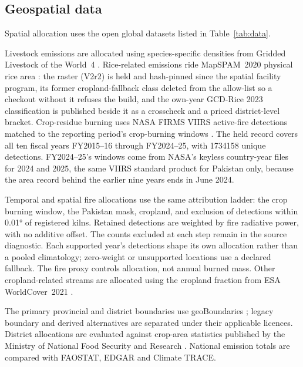\subsection{Geospatial data}

Spatial allocation uses the open global datasets listed in Table~\ref{tab:data}.

Livestock emissions are allocated using species-specific densities from Gridded Livestock of
the World~4 \citep{glw4}. Rice-related emissions ride MapSPAM~2020 physical rice
area \citep{mapspam2020}: the raster (V2r2) is held and hash-pinned since the
spatial facility program, its former cropland-fallback class deleted from the
allow-list so a checkout without it refuses the build, and the own-year GCD-Rice
2023 classification is published beside it as a crosscheck and a priced
district-level bracket. Crop-residue
burning uses NASA FIRMS VIIRS active-fire detections matched to the reporting
period's crop-burning windows \citep{firms}. The held record covers all ten
fiscal years FY2015--16 through FY2024--25, with \num{1734158} unique
detections. FY2024--25's windows come from NASA's keyless country-year files
for 2024 and 2025, the same VIIRS standard product for Pakistan only, because
the area record behind the earlier nine years ends in June 2024.

Temporal and spatial fire allocations use the same attribution ladder: the crop
burning window, the Pakistan mask, cropland, and exclusion of detections within
\num{0.01}\si{\degree} of registered kilns. Retained detections are weighted by
fire radiative power, with no additive offset. The counts excluded at each step
remain in the source diagnostic. Each supported year's detections shape its own
allocation rather than a pooled climatology; zero-weight or unsupported locations
use a declared fallback. The fire proxy controls allocation, not annual burned mass.
Other
cropland-related streams are allocated using the cropland fraction from ESA WorldCover~2021
\citep{worldcover2021}.

The primary provincial and district boundaries use geoBoundaries
\citep{runfola2020}; legacy boundary and derived alternatives are separated under
their applicable licences. District allocations are evaluated
against crop-area statistics published by the Ministry of National Food Security and
Research \citep{mnfsrcrops}. National emission totals are compared with FAOSTAT, EDGAR and
Climate TRACE.


